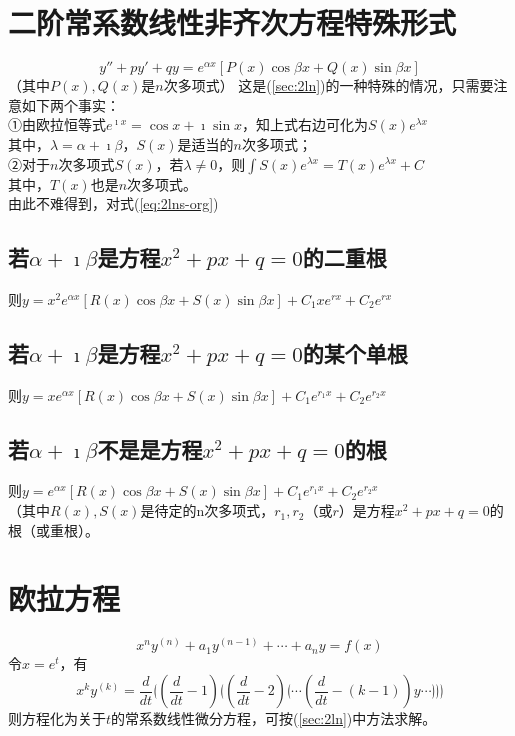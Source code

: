 \documentclass[UTF8]{ctexart}
\newcommand\mathe{\mathit{e}}
\begin{document}
\section{二阶常系数线性非齐次方程特殊形式} \label{sec:2lns}
	\begin{equation}
	y''+py'+qy=\mathe^{\alpha x} [ P(x)\cos \beta x+Q(x)\sin \beta x ] \label{eq:2lns-org}
	\end{equation}
	（其中$P(x),Q(x)$是$n$次多项式）
	这是(\ref{sec:2ln})的一种特殊的情况，只需要注意如下两个事实： \\
	①由欧拉恒等式$\mathe^{\imath x}=\cos x+\imath \sin x$，知上式右边可化为$S(x)\mathe^{\lambda x}$ \\
	其中，$\lambda =\alpha +\imath \beta $，$S(x)$是适当的$n$次多项式； \\
	②对于$n$次多项式$S(x)$，若$\lambda \neq 0$，则$\int S(x)\mathe^{\lambda x}=T(x)\mathe^{\lambda x}+C$ \\
	其中，$T(x)$也是$n$次多项式。 \\
	由此不难得到，对式(\ref{eq:2lns-org})
	\subsection{若$\alpha +\imath \beta $是方程$x^{2}+px+q=0$的二重根}
		则$y=x^{2}\mathe^{\alpha x} [ R(x)\cos \beta x+S(x)\sin \beta x ] +C_{1}x\mathe^{rx}+C_{2}\mathe^{rx} $
	\subsection{若$\alpha +\imath \beta $是方程$x^{2}+px+q=0$的某个单根}
		则$y=x\mathe^{\alpha x} [ R(x)\cos \beta x+S(x)\sin \beta x ] +C_{1}\mathe^{r_{1}x}+C_{2}\mathe^{r_{2}x} $
	\subsection{若$\alpha +\imath \beta $不是是方程$x^{2}+px+q=0$的根}
		则$y=\mathe^{\alpha x} [ R(x)\cos \beta x+S(x)\sin \beta x ] +C_{1}\mathe^{r_{1}x}+C_{2}\mathe^{r_{2}x} $ \\
	（其中$R(x),S(x)$是待定的n次多项式，$r_{1},r_{2}$（或$r$）是方程$x^{2}+px+q=0$的根（或重根）。

\section{欧拉方程}
	\begin{equation}
		x^{n}y^{(n)}+a_{1}y^{(n-1)}+\cdots +a_{n}y=f(x)
	\end{equation}
	令$x=\mathe^{t}$，有
	\begin{equation}
		x^{k}y^{(k)}=\frac{d}{dt} \lgroup (\frac{d}{dt}-1) \lgroup (\frac{d}{dt}-2) \lgroup \cdots (\frac{d}{dt}-(k-1))y \cdots \rgroup \rgroup \rgroup
	\end{equation}
	则方程化为关于$t$的常系数线性微分方程，可按(\ref{sec:2ln})中方法求解。
\end{document}
